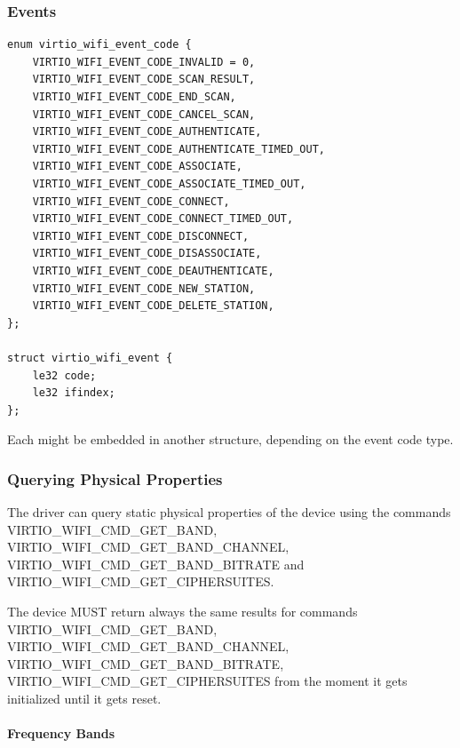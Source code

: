 \subsubsection{Events}\label{sec:sec:Device Types / 802.11 Device / Device Operation / Events}

\begin{lstlisting}
enum virtio_wifi_event_code {
	VIRTIO_WIFI_EVENT_CODE_INVALID = 0,
	VIRTIO_WIFI_EVENT_CODE_SCAN_RESULT,
	VIRTIO_WIFI_EVENT_CODE_END_SCAN,
	VIRTIO_WIFI_EVENT_CODE_CANCEL_SCAN,
	VIRTIO_WIFI_EVENT_CODE_AUTHENTICATE,
	VIRTIO_WIFI_EVENT_CODE_AUTHENTICATE_TIMED_OUT,
	VIRTIO_WIFI_EVENT_CODE_ASSOCIATE,
	VIRTIO_WIFI_EVENT_CODE_ASSOCIATE_TIMED_OUT,
	VIRTIO_WIFI_EVENT_CODE_CONNECT,
	VIRTIO_WIFI_EVENT_CODE_CONNECT_TIMED_OUT,
	VIRTIO_WIFI_EVENT_CODE_DISCONNECT,
	VIRTIO_WIFI_EVENT_CODE_DISASSOCIATE,
	VIRTIO_WIFI_EVENT_CODE_DEAUTHENTICATE,
	VIRTIO_WIFI_EVENT_CODE_NEW_STATION,
	VIRTIO_WIFI_EVENT_CODE_DELETE_STATION,
};

struct virtio_wifi_event {
	le32 code;
	le32 ifindex;
};
\end{lstlisting}

Each  might be embedded in another structure, depending on the event code type.

\subsubsection{Querying Physical Properties}\label{sec:Device Types / 802.11 Device / Device Operation / Querying Physical Properties}

The driver can query static physical properties of the device using the
commands VIRTIO_WIFI_CMD_GET_BAND, VIRTIO_WIFI_CMD_GET_BAND_CHANNEL,
VIRTIO_WIFI_CMD_GET_BAND_BITRATE and VIRTIO_WIFI_CMD_GET_CIPHERSUITES.


The device MUST return always the same results for commands
VIRTIO_WIFI_CMD_GET_BAND, VIRTIO_WIFI_CMD_GET_BAND_CHANNEL,
VIRTIO_WIFI_CMD_GET_BAND_BITRATE, VIRTIO_WIFI_CMD_GET_CIPHERSUITES from the
moment it gets initialized until it gets reset.

\paragraph{Frequency Bands}\label{sec:Device Types / 802.11 Device / Device Operation / Querying Physical Properties / Frequency Bands}

